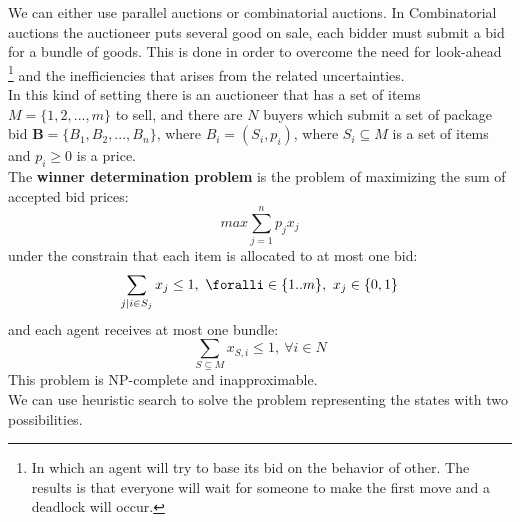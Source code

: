 \documentclass[10pt,a4paper]{article}
\begin{document}
We can either use parallel auctions or combinatorial auctions.
In Combinatorial auctions the auctioneer puts several good on sale, each bidder must submit a bid for a bundle of goods. This is done in order to overcome the need for look-ahead \footnote{In which an agent will try to base its bid on the behavior of other. The results is that everyone will wait for someone to make the first move and a deadlock will occur.} and the inefficiencies that arises from the related uncertainties.\\
In this kind of setting there is an auctioneer that has a set of items $M=	\{1,2,...,m\}$ to sell, and there are $N$ buyers which submit a set of package bid $\mathbf{B}=\{B_1,B_2,...,B_n\}$, where $B_i=(S_i,p_i)$, where $S_i \subseteq M$ is a set of items and $p_i \ge 0$ is a price.\\
The \textbf{winner determination problem} is the problem of maximizing the sum of accepted bid prices:
\[max \sum_{j=1}^np_jx_j\] 
under the constrain that each item is allocated to at most one bid:
\[ \sum_{j|i\in S_j}x_j \le 1,\ \foralli \in \{1..m\},\ x_j \in \{0,1\}\]
and each agent receives at most one bundle:
\[\sum_{S \subseteq M} x_{S,i} \le 1,\ \forall i\in N\]
This problem is NP-complete and inapproximable.\\
We can use heuristic search to solve the problem representing the states with two possibilities.
\end{document}
